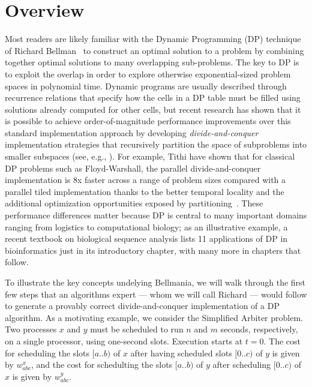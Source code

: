 \section{Overview}
\label{overview}

Most readers are likely familiar with the Dynamic Programming (DP) technique of Richard Bellman~\cite{03/Bellman:DP} to construct an optimal solution to a problem by combining together optimal solutions to many overlapping sub-problems. The key to DP is to exploit the overlap in order to explore otherwise exponential-sized problem spaces in polynomial time. Dynamic programs are usually described through recurrence relations that specify how the cells in a DP table must be filled using solutions already computed for other cells, but recent research has shown that it is possible to achieve order-of-magnitude performance improvements over this standard implementation approach by developing \emph{divide-and-conquer}  implementation strategies that recursively
partition the space of subproblems into smaller subspaces (see, e.g., \cite{IPDPS15/Tithi}).   For example, Tithi \etal{} have shown that for classical DP problems such as Floyd-Warshall, the parallel divide-and-conquer implementation is  8x faster  across a range of problem sizes compared with a parallel tiled implementation thanks to the better temporal locality and the additional optimization opportunities exposed by partitioning~\cite{IPDPS15/Tithi}. These performance differences matter because  DP is central to many important domains ranging from logistics to computational biology; as an illustrative example, a recent textbook \cite{DurbinEdKr98} on biological sequence analysis lists 11 applications of DP in bioinformatics just in its introductory chapter, with many more in chapters that follow. 

\newcommand{\xidx}{i}
\newcommand{\yidx}{j}
\newcommand{\xw}[1]{w^x_{#1}}
\newcommand{\yw}[1]{w^y_{#1}}


To illustrate the key concepts undelying Bellmania, we will walk through the first
few steps that an algorithms expert --- whom we will call Richard --- would follow to
generate a provably correct divide-and-conquer implementation of a DP algorithm.
As a motivating example, we consider the Simplified Arbiter problem.
Two processes $x$ and $y$ must be scheduled to run $n$ and $m$ seconds,
respectively, on a single processor, using one-second slots.
Execution starts at $t=0$. The cost for scheduling the slots $[a..b)$ of $x$ after
having scheduled slots $[0..c)$ of $y$
is given by $\xw{abc}$, and the cost for schedulting the slots $[a..b)$ of $y$
after scheduling $[0..c)$ of $x$ is given by $\yw{abc}$.

